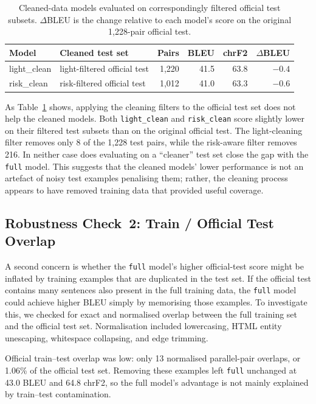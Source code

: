 \documentclass[11pt]{article}
\begin{document}
\begin{table}[ht]
\centering
\begin{tabular}{llrrrr}
\toprule
\textbf{Model} & \textbf{Cleaned test set} & \textbf{Pairs} & \textbf{BLEU} & \textbf{chrF2} & \textbf{$\Delta$BLEU} \\
\midrule
light\_clean & light-filtered official test & 1,220 & 41.5 & 63.8 & $-0.4$ \\
risk\_clean  & risk-filtered official test  & 1,012 & 41.0 & 63.3 & $-0.6$ \\
\bottomrule
\end{tabular}
\caption{Cleaned-data models evaluated on correspondingly filtered official test subsets. $\Delta$BLEU is the change relative to each model's score on the original 1,228-pair official test.}
\label{tab:cleaned-test}
\end{table}

As Table~\ref{tab:cleaned-test} shows, applying the cleaning filters to the official test set does not help the cleaned models. Both \texttt{light\_clean} and \texttt{risk\_clean} score slightly lower on their filtered test subsets than on the original official test. The light-cleaning filter removes only 8 of the 1,228 test pairs, while the risk-aware filter removes 216. In neither case does evaluating on a ``cleaner'' test set close the gap with the \texttt{full} model. This suggests that the cleaned models' lower performance is not an artefact of noisy test examples penalising them; rather, the cleaning process appears to have removed training data that provided useful coverage.

\subsection{Robustness Check~2: Train / Official Test Overlap}
\label{sec:overlap}

A second concern is whether the \texttt{full} model's higher official-test score might be inflated by training examples that are duplicated in the test set. If the official test contains many sentences also present in the full training data, the \texttt{full} model could achieve higher BLEU simply by memorising those examples. To investigate this, we checked for exact and normalised overlap between the full training set and the official test set. Normalisation included lowercasing, HTML entity unescaping, whitespace collapsing, and edge trimming.

Official train--test overlap was low: only 13 normalised parallel-pair overlaps, or 1.06\% of the official test set. Removing these examples left \texttt{full} unchanged at 43.0 BLEU and 64.8 chrF2, so the full model's advantage is not mainly explained by train--test contamination.
\end{document}
